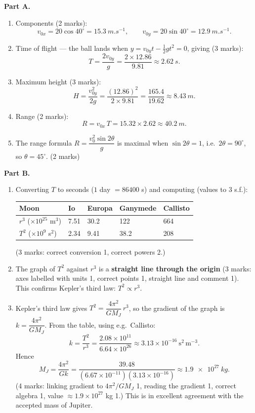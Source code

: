 \documentclass[11pt]{article}
\begin{document}
\begin{corrige}
\textbf{Part A.}
\begin{enumerate}
\item Components (2 marks):
\[
v_{0x} = 20\cos 40^{\circ} = \SI{15.3}{m.s^{-1}}, \qquad
v_{0y} = 20\sin 40^{\circ} = \SI{12.9}{m.s^{-1}}.
\]
\item Time of flight — the ball lands when $y = v_{0y}t - \frac12 gt^2 = 0$, giving (3 marks):
\[
T = \frac{2v_{0y}}{g} = \frac{2 \times 12.86}{9.81} \approx \SI{2.62}{s}.
\]
\item Maximum height (3 marks):
\[
H = \frac{v_{0y}^2}{2g} = \frac{(12.86)^2}{2\times 9.81} = \frac{165.4}{19.62} \approx \SI{8.43}{m}.
\]
\item Range (2 marks):
\[
R = v_{0x}\,T = 15.32 \times 2.62 \approx \SI{40.2}{m}.
\]
\item The range formula $R = \dfrac{v_0^2 \sin 2\theta}{g}$ is maximal when $\sin 2\theta = 1$, i.e.\ $2\theta = 90^{\circ}$, so $\theta = 45^{\circ}$. (2 marks)
\end{enumerate}
\textbf{Part B.}
\begin{enumerate}
\item Converting $T$ to seconds ($1$ day $= 86400$ s) and computing (values to 3 s.f.):
\begin{center}
\begin{tabularx}{\linewidth}{|l|X|X|X|X|}
\hline
\rowcolor{popblueL} Moon & Io & Europa & Ganymede & Callisto \\
\hline $r^3$ ($\times 10^{25}$ m$^3$) & 7.51 & 30.2 & 122 & 664 \\
\hline $T^2$ ($\times 10^{9}$ s$^2$) & 2.34 & 9.41 & 38.2 & 208 \\
\hline
\end{tabularx}
\end{center}
(3 marks: correct conversion 1, correct powers 2.)
\item The graph of $T^2$ against $r^3$ is a \textbf{straight line through the origin} (3 marks: axes labelled with units 1, correct points 1, straight line and comment 1). This confirms Kepler's third law: $T^2 \propto r^3$.
\item Kepler's third law gives $T^2 = \dfrac{4\pi^2}{GM_J}\,r^3$, so the gradient of the graph is $k = \dfrac{4\pi^2}{GM_J}$. From the table, using e.g.\ Callisto:
\[
k = \frac{T^2}{r^3} = \frac{2.08\times10^{11}}{6.64\times10^{26}} \approx 3.13\times10^{-16}\ \mathrm{s^2\,m^{-3}}.
\]
Hence
\[
M_J = \frac{4\pi^2}{Gk} = \frac{39.48}{(6.67\times10^{-11})(3.13\times10^{-16})}
\approx \SI{1.9e27}{kg}.
\]
(4 marks: linking gradient to $4\pi^2/GM_J$ 1, reading the gradient 1, correct algebra 1, value $\approx 1.9\times10^{27}$ kg 1.) This is in excellent agreement with the accepted mass of Jupiter.
\end{enumerate}
\end{corrige}
\end{document}
